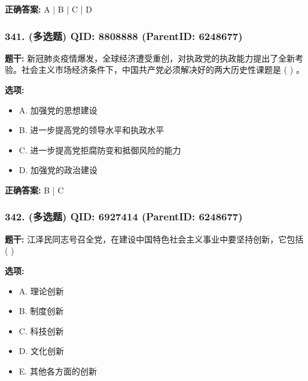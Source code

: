 \documentclass[12pt,UTF8]{ctexart}
\begin{document}
\textbf{正确答案:}
A | B | C | D

\vspace{0.3em}\hrulefill\vspace{0.7em}

\subsubsection*{341. (多选题) \small QID: 8808888 (ParentID: 6248677)}

\textbf{题干:}
新冠肺炎疫情爆发，全球经济遭受重创，对执政党的执政能力提出了全新考验。社会主义市场经济条件下，中国共产党必须解决好的两大历史性课题是 ( ) 。



\textbf{选项:}
\begin{itemize}[leftmargin=*]

  \item A. 加强党的思想建设

  \item B. 进一步提高党的领导水平和执政水平

  \item C. 进一步提高党拒腐防变和抵御风险的能力

  \item D. 加强党的政治建设

\end{itemize}

\textbf{正确答案:}
B | C

\vspace{0.3em}\hrulefill\vspace{0.7em}

\subsubsection*{342. (多选题) \small QID: 6927414 (ParentID: 6248677)}

\textbf{题干:}
江泽民同志号召全党，在建设中国特色社会主义事业中要坚持创新，它包括( )



\textbf{选项:}
\begin{itemize}[leftmargin=*]

  \item A. 理论创新

  \item B. 制度创新

  \item C. 科技创新

  \item D. 文化创新

  \item E. 其他各方面的创新

\end{itemize}
\end{document}
